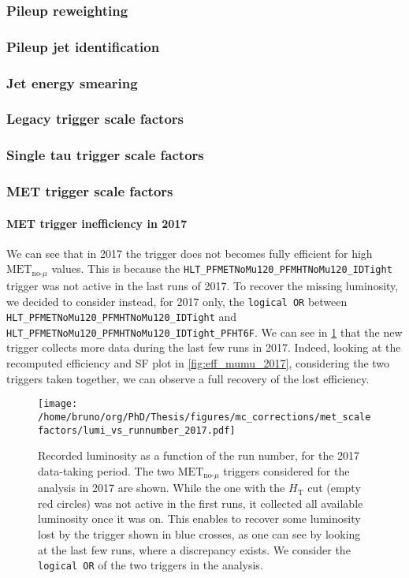 \documentclass[11pt]{article}
\newcommand{\httt}{H_{\text{T}}}
\newcommand{\metnomu}{\text{MET}_{\text{no-}\mu}}
\newcommand{\logicor}[1]{\texttt{logical~OR}}
\begin{document}
\subsubsection{Pileup reweighting}
\label{sec:org37e1546}
\subsubsection{Pileup jet identification}
\label{sec:org51fff3c}
\subsubsection{Jet energy smearing}
\label{sec:org2dc8967}
\subsubsection{Legacy trigger scale factors}
\label{sec:org1fd6e56}
\subsubsection{Single tau trigger scale factors}
\label{sec:org0d8822b}
\subsubsection{MET trigger scale factors}
\label{sec:orgf960945}
\paragraph{MET trigger inefficiency in 2017}

We can see that in 2017 the trigger does not becomes fully efficient for high \(\metnomu\) values.
This is because the \texttt{HLT\_PFMETNoMu120\_PFMHTNoMu120\_IDTight} trigger was not active in the last runs of 2017.
To recover the missing luminosity, we decided to consider instead, for 2017 only, the \logicor{} between \texttt{HLT\_PFMETNoMu120\_PFMHTNoMu120\_IDTight} and \texttt{HLT\_PFMETNoMu120\_PFMHTNoMu120\_IDTight\_PFHT6F}.
We can see in \cref{fig:lumi_vs_runnumber_2017} that the new trigger collects more data during the last few runs in 2017.
Indeed, looking at the recomputed efficiency and SF plot in \cref{fig:eff_mumu_2017}, considering the two triggers taken together, we can observe a full recovery of the lost efficiency.

\begin{figure}
\texttt{[image: /home/bruno/org/PhD/Thesis/figures/mc\_corrections/met\_scalefactors/lumi\_vs\_runnumber\_2017.pdf]}
\caption{\label{fig:lumi_vs_runnumber_2017}Recorded luminosity as a function of the run number, for the 2017 data-taking period. The two \(\metnomu\) triggers considered for the analysis in 2017 are shown. While the one with the \(\httt\) cut (empty red circles) was not active in the first runs,  it collected all available luminosity once it was on. This enables to recover some luminosity lost by the trigger shown in blue crosses, as one can see by looking at the last few runs, where a discrepancy exists. We consider the \logicor{} of the two triggers in the analysis.}
\end{figure}
\end{document}
